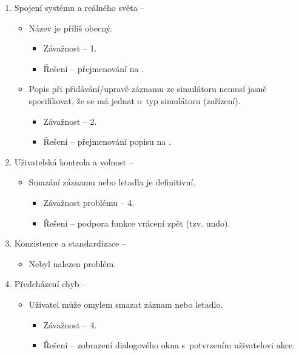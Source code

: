 \documentclass[thesis=M,czech]{FITthesis}[2012/06/26]
\begin{document}
\begin{enumerate}
\item Spojení systému a reálného světa -- 
\begin{itemize}
 	\item Název  je příliš obecný.
 	\begin{itemize}
 		\item Závažnost -- 1.
 		\item Řešení -- přejmenování  na .
 	\end{itemize}
 	\item Popis  při přidávání/upravě záznamu ze simulátoru nemusí jasně specifikovat, že se má jednat o~typ simulátoru (zařízení).
 	\begin{itemize}
 		\item Závažnost -- 2.
 		\item Řešení -- přejmenování popisu  na .
 	\end{itemize}
\end{itemize}
 
\item Uživatelská kontrola a volnost -- 
\begin{itemize}
	\item Smazání záznamu nebo letadla je definitivní.
	\begin{itemize}
		\item Závažnost problému -- 4.
		\item Řešení -- podpora funkce vrácení zpět (tzv. undo).
	\end{itemize}
\end{itemize}
 
\item Konzistence a standardizace -- 
\begin{itemize}
 	\item Nebyl nalezen problém.
\end{itemize}
 
\item Předcházení chyb -- 
\begin{itemize}
 	\item Uživatel může omylem smazat záznam nebo letadlo.
 	\begin{itemize}
 		\item Závažnost -- 4.
 		\item Řešení -- zobrazení dialogového okna s~potvrzením uživatelovi akce.
 	\end{itemize}
\end{itemize}
 

\end{enumerate}
\end{document}
